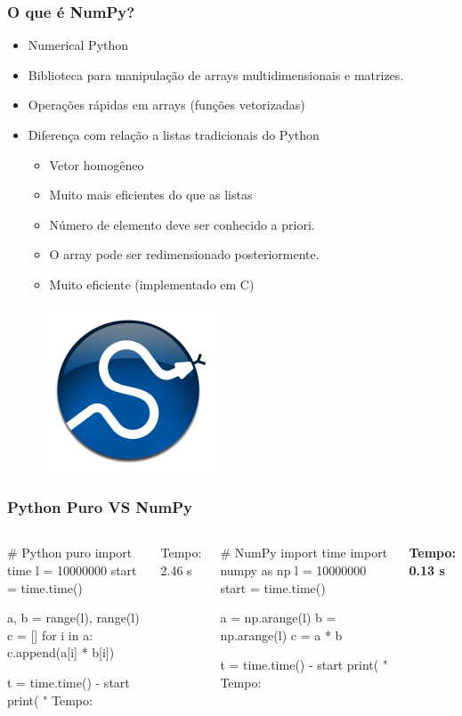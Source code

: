 \documentclass[12pt,t,graphics]{beamer}
\newcommand{\ft}[1]{\frametitle{#1}}
\newcommand{\bi}{\begin{itemize}}
\newcommand{\ei}{\end{itemize}}
\begin{document}
\begin{frame}[fragile]
  \ft{O que é NumPy?}
  \bi
\item Numerical Python
\item Biblioteca para manipulação de arrays
  multidimensionais e matrizes.
\item Operações rápidas em arrays (funções
  vetorizadas)
\item Diferença com relação a listas tradicionais do Python
  \bi
\item Vetor homogêneo
\item Muito mais eficientes do que as listas
\item Número de elemento deve ser conhecido a priori.
\item O array pode ser redimensionado posteriormente.
\item Muito eficiente (implementado em C)
  \ei
  \ei
  \begin{figure}
    \centering
    \includegraphics[scale=0.4]{img/numpy}
    \label{fig:numpy}
  \end{figure}
\end{frame}


\begin{frame}[fragile]
  \ft{Python Puro VS NumPy}
  \begin{columns}
	\begin{python}
# Python puro
import time
l = 10000000
start = time.time()

a, b = range(l), range(l)
c = []
for i in a:
    c.append(a[i] * b[i])

t = time.time() - start
print( " Tempo: %
	\end{python}
	Tempo: 2.46 s
	\begin{python}
# NumPy
import time
import numpy as np
l = 10000000
start = time.time()

a = np.arange(l)
b = np.arange(l)
c = a * b

t = time.time() - start
print( " Tempo: %
	\end{python}
	\textbf{Tempo: 0.13 s}
  \end{columns}
\end{frame}
\end{document}

